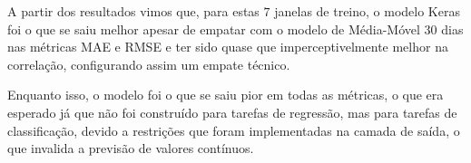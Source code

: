\begin{table}[]
\begin{center}
\caption{Previsões para $7$ dias e métricas dos modelos das janelas de cotações do Dólar.}\label{tabela:teste_7}
\end{center}
\end{table}

A partir dos resultados vimos que, para estas $7$ janelas de treino, o modelo Keras foi o que se saiu melhor apesar de empatar com o modelo de Média-Móvel 30 dias nas métricas MAE e RMSE e ter sido quase que imperceptivelmente melhor na correlação, configurando assim um empate técnico. 

Enquanto isso, o modelo  foi o que se saiu pior em todas as métricas, o que era esperado já que não foi construído para tarefas de regressão, mas para tarefas de classificação, devido a restrições que foram implementadas na camada de saída, o que invalida a previsão de valores contínuos.


